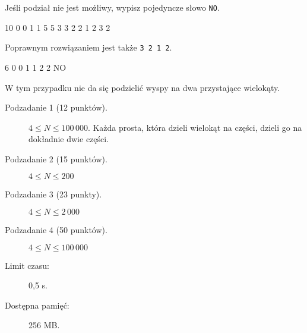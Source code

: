 \documentclass{boi2014-pl}
\newcommand{\constant}[1]{{\tt #1}}
\begin{document}
        Jeśli podział nie jest możliwy, wypisz pojedyncze słowo \constant{NO}.

    \clearpage

    \Examples
	\example
	{
		10  0  0  1  1  5  5  3  3  2  2
	}
	{
		1 2 3 2
	}
	{
        Poprawnym rozwiązaniem jest także {\tt 3 2 1 2}.
	
        \begin{center}
        \end{center}
        }

	\example
	{
		6  0  0  1  1  2  2
	}
	{
		NO
	}
        {
        W tym przypadku nie da się podzielić wyspy na dwa przystające wielokąty.
        \begin{center}
        \end{center}
        }

    \Scoring

    \begin{description}
        \item[Podzadanie 1 (12 punktów).] $4 \le N \le 100\,000$.
        Każda prosta, która dzieli wielokąt na części, dzieli go na dokładnie dwie części.
        \item[Podzadanie 2 (15 punktów).] $4 \le N \le 200$
        \item[Podzadanie 3 (23 punkty).] $4 \le N \le 2\, 000$
        \item[Podzadanie 4 (50 punktów).] $4 \le N \le 100\, 000$
    \end{description}

    \Constraints

    \begin{description}
        \item[Limit czasu:] 0,5 s.
        \item[Dostępna pamięć:] 256 MB.
    \end{description}
\end{document}
